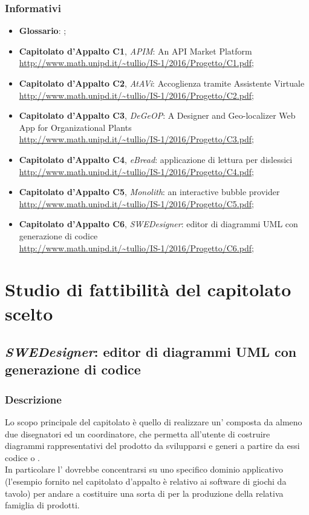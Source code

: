 		\subsubsection{Informativi}
		\begin{itemize}
			\item \textbf{Glossario}: \Glossario;
			\item \textbf{Capitolato d'Appalto C1}, \emph{APIM}: An API Market Platform
			\\ \url{http://www.math.unipd.it/~tullio/IS-1/2016/Progetto/C1.pdf};
			\item \textbf{Capitolato d'Appalto C2}, \emph{AtAVi}: Accoglienza tramite Assistente Virtuale
			\\ \url{http://www.math.unipd.it/~tullio/IS-1/2016/Progetto/C2.pdf};
			\item \textbf{Capitolato d'Appalto C3}, \emph{DeGeOP}: A Designer and Geo-localizer Web App for Organizational Plants
			\\ \url{http://www.math.unipd.it/~tullio/IS-1/2016/Progetto/C3.pdf};
			\item \textbf{Capitolato d'Appalto C4}, \emph{eBread}: applicazione di lettura per dislessici
			\\ \url{http://www.math.unipd.it/~tullio/IS-1/2016/Progetto/C4.pdf};
			\item \textbf{Capitolato d'Appalto C5}, \emph{Monolith}: an interactive bubble provider
			\\ \url{http://www.math.unipd.it/~tullio/IS-1/2016/Progetto/C5.pdf};
			\item \textbf{Capitolato d'Appalto C6}, \emph{SWEDesigner}: editor di diagrammi UML con generazione di codice
			\\ \url{http://www.math.unipd.it/~tullio/IS-1/2016/Progetto/C6.pdf};
		\end{itemize}


	
\section{Studio di fattibilità del capitolato scelto}
	\subsection{\emph{SWEDesigner}: editor di diagrammi UML con generazione di codice}
		\subsubsection{Descrizione}
		Lo scopo principale del capitolato è quello di realizzare un' composta da almeno due disegnatori
		ed un coordinatore, che permetta all'utente di costruire diagrammi  rappresentativi del prodotto da svilupparsi e generi a partire da essi codice 
		 o .
		\\In particolare l' dovrebbe concentrarsi su uno specifico dominio applicativo (l'esempio fornito nel capitolato d'appalto è relativo ai software 
		di giochi da tavolo) per andare a costituire una sorta di  per la produzione della relativa famiglia di prodotti.
		
